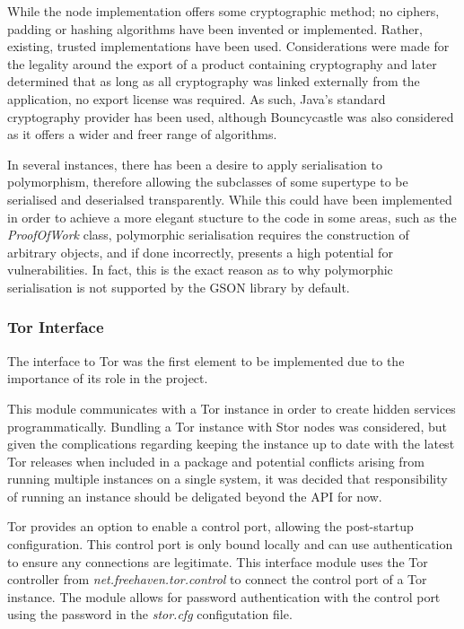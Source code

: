 			While the node implementation offers some cryptographic method; no ciphers, padding or hashing algorithms have been invented or implemented. Rather, existing, trusted implementations have been used. Considerations were made for the legality around the export of a product containing cryptography and later determined that as long as all cryptography was linked externally from the application, no export license was required. As such, Java's standard cryptography provider has been used, although Bouncycastle was also considered as it offers a wider and freer range of algorithms.
			
			In several instances, there has been a desire to apply serialisation to polymorphism, therefore allowing the subclasses of some supertype to be serialised and deserialsed transparently. While this could have been implemented in order to achieve a more elegant stucture to the code in some areas, such as the \textit{ProofOfWork} class, polymorphic serialisation requires the construction of arbitrary objects, and if done incorrectly, presents a high potential for vulnerabilities. In fact, this is the exact reason as to why polymorphic serialisation is not supported by the GSON library by default.
			
		\subsubsection*{Tor Interface}
			The interface to Tor was the first element to be implemented due to the importance of its role in the project.
			
			This module communicates with a Tor instance in order to create hidden services programmatically. Bundling a Tor instance with Stor nodes was considered, but given the complications regarding keeping the instance up to date with the latest Tor releases when included in a package and potential conflicts arising from running multiple instances on a single system, it was decided that responsibility of running an instance should be deligated beyond the API for now.
			
			Tor provides an option to enable a control port, allowing the post-startup configuration. This control port is only bound locally and can use authentication to ensure any connections are legitimate. This interface module uses the Tor controller from \textit{net.freehaven.tor.control} to connect the control port of a Tor instance. The module allows for password authentication with the control port using the password in the \textit{stor.cfg} configutation file.
